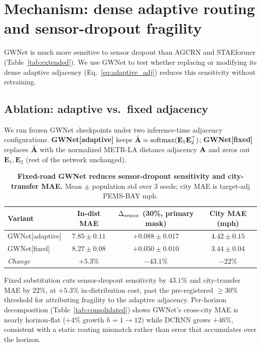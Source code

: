 \section{Mechanism: dense adaptive routing and sensor-dropout fragility}
\label{sec:mechanism}

GWNet is much more sensitive to sensor dropout than AGCRN and STAEformer (Table~\ref{tab:extended}). We use GWNet to test whether replacing or modifying its dense adaptive adjacency (Eq.~\ref{eq:adaptive_adj}) reduces this sensitivity without retraining.

\subsection{Ablation: adaptive vs.\ fixed adjacency}

We run frozen GWNet checkpoints under two inference-time adjacency
configurations. \textbf{GWNet[adaptive]} keeps
$\hat{\mathbf{A}} = \text{softmax}(\mathbf{E}_1 \mathbf{E}_2^\top)$;
\textbf{GWNet[fixed]} replaces $\hat{\mathbf{A}}$ with the normalized METR-LA distance
adjacency $\mathbf{A}$ and zeros out $\mathbf{E}_1, \mathbf{E}_2$ (rest of the
network unchanged).

\begin{table}[H]
\centering
\caption{\textbf{Fixed-road GWNet reduces sensor-dropout sensitivity and city-transfer
MAE.} Mean $\pm$ population std over 3 seeds; city MAE is target-adj PEMS-BAY mph.}
\label{tab:ablation}
\vskip 0.05in
\begin{tabular}{lccc}
\toprule
\textbf{Variant} & \textbf{In-dist MAE} & \textbf{$\Delta_{\text{sensor}}$ (30\%, primary mask)} & \textbf{City MAE (mph)} \\
\midrule
GWNet[adaptive] & $7.85 \pm 0.11$ & $+0.088 \pm 0.017$ & $4.42 \pm 0.15$ \\
GWNet[fixed]    & $8.27 \pm 0.08$ & $+0.050 \pm 0.010$ & $3.44 \pm 0.04$ \\
\midrule
\emph{Change}   & $+5.3\%$        & $-43.1\%$          & $-22\%$         \\
\bottomrule
\end{tabular}
\end{table}

Fixed substitution cuts sensor-dropout sensitivity by $43.1\%$ and
city-transfer MAE by $22\%$, at $+5.3\%$ in-distribution cost, past the
pre-registered $\geq 30\%$ threshold for attributing fragility to the
adaptive adjacency. Per-horizon decomposition (Table~\ref{tab:consolidated})
shows GWNet's cross-city MAE is nearly horizon-flat ($+4\%$ growth
$h{=}1{\to}12$) while DCRNN grows $+46\%$, consistent with a static routing
mismatch rather than error that accumulates over the horizon.

